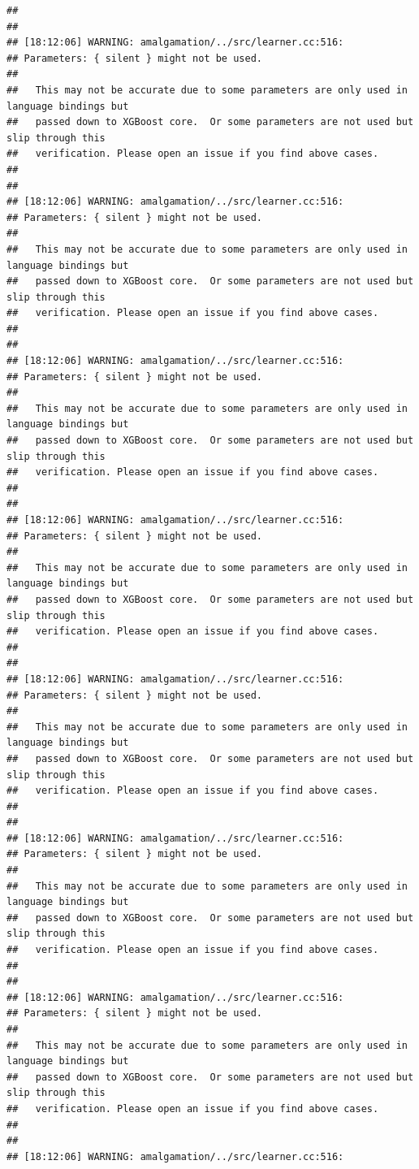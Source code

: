 \documentclass[AMS,STIX2COL]{WileyNJD-v2}\usepackage[]{graphicx}\usepackage[]{color}
\makeatletter
\newenvironment{kframe}{%
 \def\at@end@of@kframe{}%
 \ifinner\ifhmode%
  \def\at@end@of@kframe{\end{minipage}}%
  \begin{minipage}{\columnwidth}%
 \fi\fi%
 \def\FrameCommand##1{\hskip\@totalleftmargin \hskip-\fboxsep
 \colorbox{shadecolor}{##1}\hskip-\fboxsep
     \hskip-\linewidth \hskip-\@totalleftmargin \hskip\columnwidth}%
 \MakeFramed {\advance\hsize-\width
   \@totalleftmargin\z@ \linewidth\hsize
   \@setminipage}}%
 {\par\unskip\endMakeFramed%
 \at@end@of@kframe}
\newenvironment{knitrout}{}{} %
\makeatother
\begin{document}
\begin{knitrout}
\begin{kframe}
\begin{verbatim}
## 
## 
## [18:12:06] WARNING: amalgamation/../src/learner.cc:516: 
## Parameters: { silent } might not be used.
## 
##   This may not be accurate due to some parameters are only used in language bindings but
##   passed down to XGBoost core.  Or some parameters are not used but slip through this
##   verification. Please open an issue if you find above cases.
## 
## 
## [18:12:06] WARNING: amalgamation/../src/learner.cc:516: 
## Parameters: { silent } might not be used.
## 
##   This may not be accurate due to some parameters are only used in language bindings but
##   passed down to XGBoost core.  Or some parameters are not used but slip through this
##   verification. Please open an issue if you find above cases.
## 
## 
## [18:12:06] WARNING: amalgamation/../src/learner.cc:516: 
## Parameters: { silent } might not be used.
## 
##   This may not be accurate due to some parameters are only used in language bindings but
##   passed down to XGBoost core.  Or some parameters are not used but slip through this
##   verification. Please open an issue if you find above cases.
## 
## 
## [18:12:06] WARNING: amalgamation/../src/learner.cc:516: 
## Parameters: { silent } might not be used.
## 
##   This may not be accurate due to some parameters are only used in language bindings but
##   passed down to XGBoost core.  Or some parameters are not used but slip through this
##   verification. Please open an issue if you find above cases.
## 
## 
## [18:12:06] WARNING: amalgamation/../src/learner.cc:516: 
## Parameters: { silent } might not be used.
## 
##   This may not be accurate due to some parameters are only used in language bindings but
##   passed down to XGBoost core.  Or some parameters are not used but slip through this
##   verification. Please open an issue if you find above cases.
## 
## 
## [18:12:06] WARNING: amalgamation/../src/learner.cc:516: 
## Parameters: { silent } might not be used.
## 
##   This may not be accurate due to some parameters are only used in language bindings but
##   passed down to XGBoost core.  Or some parameters are not used but slip through this
##   verification. Please open an issue if you find above cases.
## 
## 
## [18:12:06] WARNING: amalgamation/../src/learner.cc:516: 
## Parameters: { silent } might not be used.
## 
##   This may not be accurate due to some parameters are only used in language bindings but
##   passed down to XGBoost core.  Or some parameters are not used but slip through this
##   verification. Please open an issue if you find above cases.
## 
## 
## [18:12:06] WARNING: amalgamation/../src/learner.cc:516: 

\end{verbatim}
\end{kframe}
\end{knitrout}
\end{document}
